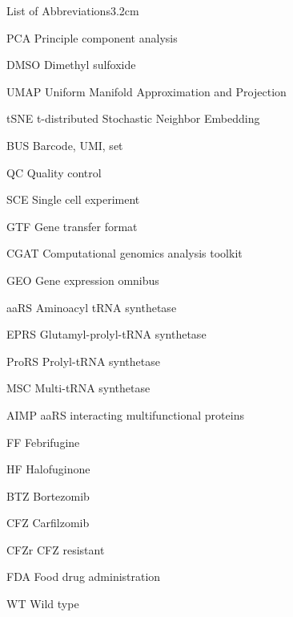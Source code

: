 \begin{mclistof}{List of Abbreviations}{3.2cm}
\item[PCA] Principle component analysis

\item[DMSO] Dimethyl sulfoxide

\item[UMAP] Uniform Manifold Approximation and Projection

\item[tSNE] t-distributed Stochastic Neighbor Embedding

\item[BUS] Barcode, UMI, set

\item[QC] Quality control

\item[SCE] Single cell experiment

\item[GTF] Gene transfer format

\item[CGAT] Computational genomics analysis toolkit

\item[GEO] Gene expression omnibus

\item[aaRS] Aminoacyl tRNA synthetase

\item[EPRS] Glutamyl-prolyl-tRNA synthetase

\item[ProRS] Prolyl-tRNA synthetase

\item[MSC] Multi-tRNA synthetase

\item[AIMP] aaRS interacting multifunctional proteins

\item[FF] Febrifugine

\item[HF] Halofuginone

\item[BTZ] Bortezomib

\item[CFZ] Carfilzomib

\item[CFZr] CFZ resistant

\item[FDA] Food drug administration

\item[WT] Wild type

\end{mclistof} 
